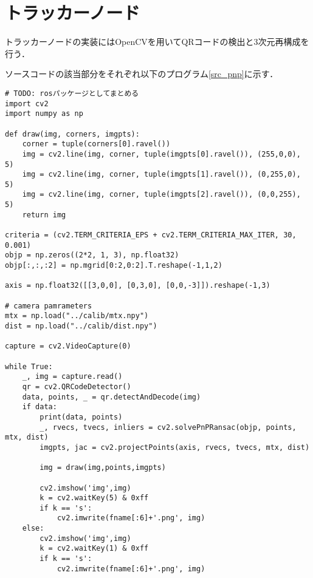 \section{トラッカーノード}
\label{implement_tracker}
トラッカーノードの実装にはOpenCVを用いてQRコードの検出と3次元再構成を行う．

ソースコードの該当部分をそれぞれ以下のプログラム\ref{src_pnp}に示す．

\begin{lstlisting}[caption=pnp\_qr.py,label=src_pnp]
# TODO: rosパッケージとしてまとめる
import cv2
import numpy as np

def draw(img, corners, imgpts):
    corner = tuple(corners[0].ravel())
    img = cv2.line(img, corner, tuple(imgpts[0].ravel()), (255,0,0), 5)
    img = cv2.line(img, corner, tuple(imgpts[1].ravel()), (0,255,0), 5)
    img = cv2.line(img, corner, tuple(imgpts[2].ravel()), (0,0,255), 5)
    return img

criteria = (cv2.TERM_CRITERIA_EPS + cv2.TERM_CRITERIA_MAX_ITER, 30, 0.001)
objp = np.zeros((2*2, 1, 3), np.float32)
objp[:,:,:2] = np.mgrid[0:2,0:2].T.reshape(-1,1,2)

axis = np.float32([[3,0,0], [0,3,0], [0,0,-3]]).reshape(-1,3)

# camera pamrameters
mtx = np.load("../calib/mtx.npy")
dist = np.load("../calib/dist.npy")

capture = cv2.VideoCapture(0)

while True:
    _, img = capture.read()
    qr = cv2.QRCodeDetector()
    data, points, _ = qr.detectAndDecode(img)
    if data:
        print(data, points)
        _, rvecs, tvecs, inliers = cv2.solvePnPRansac(objp, points, mtx, dist)
        imgpts, jac = cv2.projectPoints(axis, rvecs, tvecs, mtx, dist)

        img = draw(img,points,imgpts)

        cv2.imshow('img',img)
        k = cv2.waitKey(5) & 0xff
        if k == 's':
            cv2.imwrite(fname[:6]+'.png', img)
    else:
        cv2.imshow('img',img)
        k = cv2.waitKey(1) & 0xff
        if k == 's':
            cv2.imwrite(fname[:6]+'.png', img)
\end{lstlisting}

